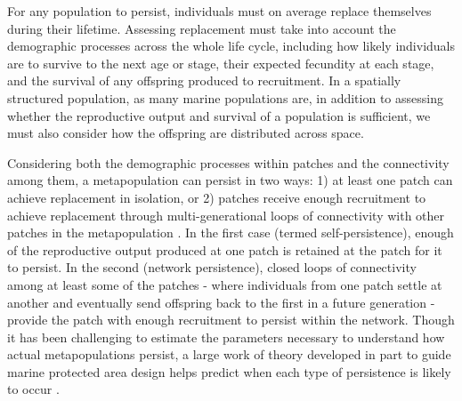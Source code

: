 \documentclass[12pt, oneside]{article}   	%
\begin{document}
For any population to persist, individuals must on average replace themselves during their lifetime. Assessing replacement must take into account the demographic processes across the whole life cycle, including how likely individuals are to survive to the next age or stage, their expected fecundity at each stage, and the survival of any offspring produced to recruitment. In a spatially structured population, as many marine populations are, in addition to assessing whether the reproductive output and survival of a population is sufficient, we must also consider how the offspring are distributed across space. %

Considering both the demographic processes within patches and the connectivity among them, a metapopulation can persist in two ways: 1) at least one patch can achieve replacement in isolation, or 2) patches receive enough recruitment to achieve replacement through multi-generational loops of connectivity with other patches in the metapopulation \citep{hastings_persistence_2006, burgess2014beyond}. In the first case (termed self-persistence), enough of the reproductive output produced at one patch is retained at the patch for it to persist. In the second (network persistence), closed loops of connectivity among at least some of the patches - where individuals from one patch settle at another and eventually send offspring back to the first in a future generation - provide the patch with enough recruitment to persist within the network. Though it has been challenging to estimate the parameters necessary to understand how actual metapopulations persist, a large work of theory developed in part to guide marine protected area design helps predict when each type of persistence is likely to occur \citep[i.e., habitat patches or protected areas that are large relative to the mean dispersal distance are likely to be self-persistent,][]{white_population_2010}. %
\end{document}
